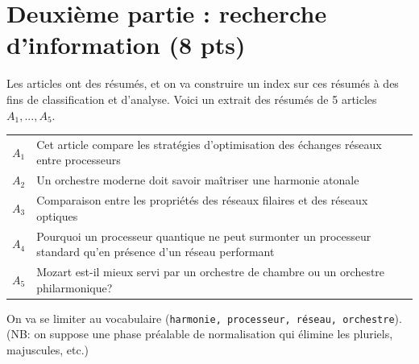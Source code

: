 \documentclass[11pt,a4paper]{article}
\begin{document}
\section*{Deuxième partie : recherche d'information (8 pts)}

Les articles ont des résumés, et on va construire un index sur ces résumés à des fins
de classification et d'analyse. Voici un extrait des résumés de 5 articles 
$A_1, ..., A_5$. 
\vspace*{0.3cm}

\begin{tabular}{lp{15cm}}
     $A_1$& Cet article compare les stratégies d'optimisation des échanges réseaux entre processeurs\\
     $A_2$& Un orchestre moderne doit savoir maîtriser une harmonie atonale\\
     $A_3$& Comparaison entre les propriétés des réseaux filaires et des réseaux optiques\\
     $A_4$& Pourquoi un processeur quantique ne peut surmonter un processeur standard
         qu'en présence d'un réseau performant\\
     $A_5$& Mozart est-il mieux servi par un orchestre de chambre ou un orchestre philarmonique?\\ 
\end{tabular}

\bigskip

On va se limiter au vocabulaire (\texttt{harmonie, processeur, réseau, orchestre}).
(NB: on suppose
     une phase préalable de normalisation qui élimine les pluriels, majuscules, etc.)
\end{document}
